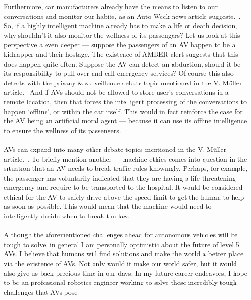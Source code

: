 \documentclass[12pt]{article}
\newcommand{\supercite}[1]{~{\textsuperscript{\cite{#1}}}}
\begin{document}
Furthermore, car manufacturers already have the means to listen to our
conversations and monitor our habits, as an Auto Week news
article suggests.\supercite{auto-week-article}. So, if a highly intelligent 
machine already has to make a life or death decision, why shouldn't it 
also monitor the wellness of its passengers?
Let us look at this perspective a even deeper --- suppose the passengers of 
an AV happen to be a kidnapper and their hostage. The existence of AMBER
alert suggests that this does happen quite often. Suppose the AV can detect
an abduction, should it be its responsibility to pull over and call emergency
services? Of course this also detects with the privacy \& surveillance debate
topic mentioned in the V. Müller article.\supercite{sep-ethics-ai} And if
AVs should not be allowed to store user's conversations in a remote location,
then that forces the intelligent processing of the conversations to happen
`offline', or within the car itself. This would in fact reinforce the case
for the AV being an artificial moral agent --- because it can use its offline
intelligence to ensure the wellness of its passengers.\\
\vspace{0in}\\
AVs can expand into many other debate topics mentioned in the V. Müller 
article.\supercite{sep-ethics-ai}. To briefly mention another --- machine
ethics comes into question in the situation that an AV needs to break
traffic rules knowingly. Perhaps, for example, the passenger has
voluntarily indicated
that they are having a life-threatening emergency and require to
be transported to the hospital. It would be considered ethical for the
AV to safely drive above the speed limit to get the human to help
as soon as possible. This would mean that the machine would need
to intelligently decide when to break the law.\\
\vspace{0in}\\
Although the aforementioned challenges ahead for autonomous vehicles will
be tough to solve, in general I am personally optimistic about the future
of level 5 AVs. I believe that humans will find solutions and make the world
a better place via the existence of AVs. Not only would it make our world safer,
but it would also give us back precious time in our days. In my future career
endeavors, I hope to be an professional robotics engineer working to solve these
incredibly tough challenges that AVs pose.
\pagebreak



\end{document}
